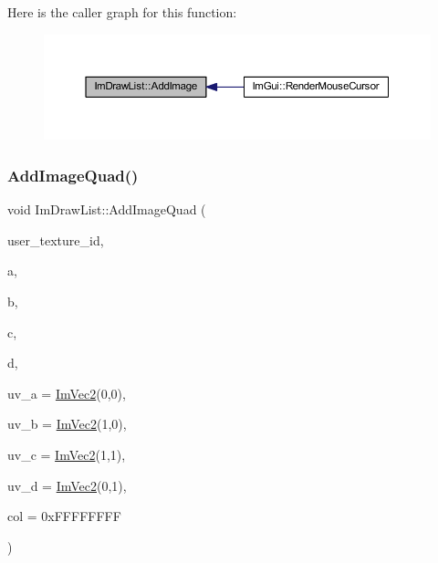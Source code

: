 Here is the caller graph for this function\+:
\nopagebreak
\begin{figure}[H]
\begin{center}
\leavevmode
\includegraphics[width=350pt]{struct_im_draw_list_ac37cd998bf5f40705c7445004a029b66_icgraph}
\end{center}
\end{figure}
\mbox{\label{struct_im_draw_list_a1cc1f8d4d1812c65c7887b8d5aef31fe}} 
\subsubsection{\texorpdfstring{Add\+Image\+Quad()}{AddImageQuad()}}
{\footnotesize\ttfamily void Im\+Draw\+List\+::\+Add\+Image\+Quad (\begin{DoxyParamCaption}\item[{\mbox{\hyperlink{imgui_8h_a364f4447ecbc4ca176145ccff9db6286}{Im\+Texture\+ID}}}]{user\+\_\+texture\+\_\+id,  }\item[{const \mbox{\hyperlink{struct_im_vec2}{Im\+Vec2}} \&}]{a,  }\item[{const \mbox{\hyperlink{struct_im_vec2}{Im\+Vec2}} \&}]{b,  }\item[{const \mbox{\hyperlink{struct_im_vec2}{Im\+Vec2}} \&}]{c,  }\item[{const \mbox{\hyperlink{struct_im_vec2}{Im\+Vec2}} \&}]{d,  }\item[{const \mbox{\hyperlink{struct_im_vec2}{Im\+Vec2}} \&}]{uv\+\_\+a = {\ttfamily \mbox{\hyperlink{struct_im_vec2}{Im\+Vec2}}(0,0)},  }\item[{const \mbox{\hyperlink{struct_im_vec2}{Im\+Vec2}} \&}]{uv\+\_\+b = {\ttfamily \mbox{\hyperlink{struct_im_vec2}{Im\+Vec2}}(1,0)},  }\item[{const \mbox{\hyperlink{struct_im_vec2}{Im\+Vec2}} \&}]{uv\+\_\+c = {\ttfamily \mbox{\hyperlink{struct_im_vec2}{Im\+Vec2}}(1,1)},  }\item[{const \mbox{\hyperlink{struct_im_vec2}{Im\+Vec2}} \&}]{uv\+\_\+d = {\ttfamily \mbox{\hyperlink{struct_im_vec2}{Im\+Vec2}}(0,1)},  }\item[{\mbox{\hyperlink{imgui_8h_a118cff4eeb8d00e7d07ce3d6460eed36}{Im\+U32}}}]{col = {\ttfamily 0xFFFFFFFF} }\end{DoxyParamCaption})}

